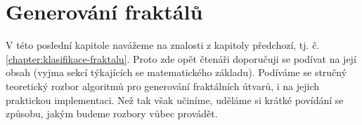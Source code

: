 \chapter{Generování fraktálů}\label{chapter:generovani-fraktalu}

V této poslední kapitole navážeme na znalosti z kapitoly předchozí, tj. č. \ref{chapter:klasifikace-fraktalu}. Proto zde opět čtenáři doporučuji se podívat na její obsah (vyjma sekcí týkajících se matematického základu). Podíváme se stručný teoretický rozbor algoritmů pro generování fraktálních útvarů, i na jejich praktickou implementaci. Než tak však učiníme, uděláme si krátké povídání se způsobu, jakým budeme rozbory vůbec provádět.




